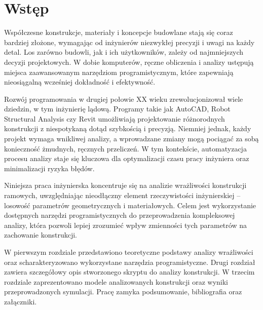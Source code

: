 \section*{Wstęp}

Współczesne konstrukcje, materiały i koncepcje budowlane stają się coraz bardziej złożone, wymagając od inżynierów niezwykłej precyzji i uwagi na każdy detal.
Los zarówno budowli, jak i ich użytkowników, zależy od najmniejszych decyzji projektowych.
W dobie komputerów, ręczne obliczenia i analizy ustępują miejsca zaawansowanym narzędziom programistycznym, które zapewniają nieosiągalną wcześniej dokładność i efektywność.

Rozwój programowania w drugiej połowie XX wieku zrewolucjonizował wiele dziedzin, w tym inżynierię lądową.
Programy takie jak AutoCAD, Robot Structural Analysis czy Revit umożliwiają projektowanie różnorodnych konstrukcji z niespotykaną dotąd szybkością i precyzją.
Niemniej jednak, każdy projekt wymaga wnikliwej analizy, a wprowadzane zmiany mogą pociągać za sobą konieczność żmudnych, ręcznych przeliczeń.
W tym kontekście, automatyzacja procesu analizy staje się kluczowa dla optymalizacji czasu pracy inżyniera oraz minimalizacji ryzyka błędów.

Niniejsza praca inżynierska koncentruje się na analizie wrażliwości konstrukcji ramowych, uwzględniając nieodłączny element rzeczywistości inżynierskiej – losowość parametrów geometrycznych i materiałowych.
Celem jest wykorzystanie dostępnych narzędzi programistycznych do przeprowadzenia kompleksowej analizy, która pozwoli lepiej zrozumieć wpływ zmienności tych parametrów na zachowanie konstrukcji.

W pierwszym rozdziale przedstawiono teoretyczne podstawy analizy wrażliwości oraz scharakteryzowano wykorzystane narzędzia programistyczne.
Drugi rozdział zawiera szczegółowy opis stworzonego skryptu do analizy konstrukcji.
W trzecim rozdziale zaprezentowano modele analizowanych konstrukcji oraz wyniki przeprowadzonych symulacji.
Pracę zamyka podsumowanie, bibliografia oraz załączniki.
